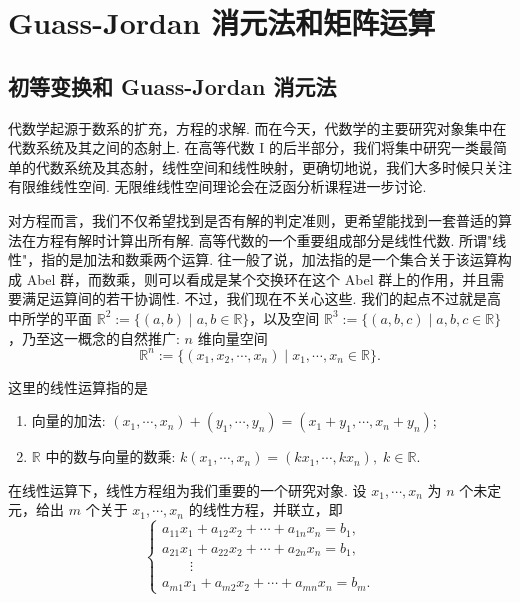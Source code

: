 \documentclass[10pt,openany]{article}
\theoremstyle{thmstyle} %
\theoremstyle{defstyle} %
\theoremstyle{prostyle} %
\theoremstyle{exastyle}
\theoremstyle{remstyle}
\begin{document}
\pagestyle{fancy}
\rhead{\today}

\section{Guass-Jordan 消元法和矩阵运算}
\subsection{初等变换和 Guass-Jordan 消元法}
\label{1.1}
代数学起源于数系的扩充，方程的求解. 而在今天，代数学的主要研究对象集中在代数系统及其之间的态射上. 在高等代数 I 的后半部分，我们将集中研究一类最简单的代数系统及其态射，线性空间和线性映射，更确切地说，我们大多时候只关注有限维线性空间. 无限维线性空间理论会在泛函分析课程进一步讨论.

对方程而言，我们不仅希望找到是否有解的判定准则，更希望能找到一套普适的算法在方程有解时计算出所有解. 高等代数的一个重要组成部分是线性代数. 所谓"线性"，指的是加法和数乘两个运算. 往一般了说，加法指的是一个集合关于该运算构成 Abel 群，而数乘，则可以看成是某个交换环在这个 Abel 群上的作用，并且需要满足运算间的若干协调性. 不过，我们现在不关心这些. 我们的起点不过就是高中所学的平面 \( \mathbb{R}^2:=\{(a,b) \mid a,b \in \mathbb{R} \} \)，以及空间 \( \mathbb{R}^3:=\{ (a,b,c) \mid a,b,c \in \mathbb{R} \} \)，乃至这一概念的自然推广: \( n \) 维向量空间
\[ \mathbb{R}^n:=\{ (x_1,x_2,\cdots,x_n) \mid x_1,\cdots,x_n \in \mathbb{R} \}. \]

这里的线性运算指的是
\begin{enumerate}[(1)]
	\item 向量的加法: \( (x_1,\cdots,x_n)+(y_1,\cdots,y_n)=(x_1+y_1,\cdots,x_n+y_n) \);
	\item \( \mathbb{R} \) 中的数与向量的数乘: \( k(x_1,\cdots,x_n)=(kx_1,\cdots,kx_n), \; k \in \mathbb{R} \).
\end{enumerate} 

在线性运算下，线性方程组为我们重要的一个研究对象. 设 \( x_1,\cdots,x_n \) 为 \( n \) 个未定元，给出 \( m \) 个关于 \( x_1,\cdots,x_n \) 的线性方程，并联立，即
\begin{equation}
	\left\{\begin{array}{l}
		a_{11}x_1+a_{12}x_2+\cdots+a_{1n}x_n=b_1, \\
		a_{21}x_1+a_{22}x_2+\cdots+a_{2n}x_n=b_1, \\
		\qquad \vdots \\
		a_{m1}x_1+a_{m2}x_2+\cdots+a_{mn}x_n=b_m.
	\end{array}\right.
	\label{linequ.}
\end{equation}
\end{document}
